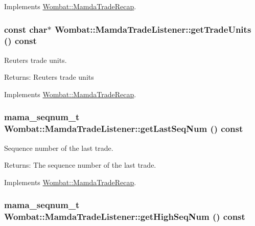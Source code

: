 Implements \hyperlink{classWombat_1_1MamdaTradeRecap_a2fb46ed6a57f14eb2a25ddbca0d902a}{Wombat::Mamda\-Trade\-Recap}.\hypertarget{classWombat_1_1MamdaTradeListener_c4b602c4ce2f49e81d4d20eef7d60711}{
\subsubsection[getTradeUnits]{\setlength{\rightskip}{0pt plus 5cm}const char$\ast$ Wombat::Mamda\-Trade\-Listener::get\-Trade\-Units () const}}
\label{classWombat_1_1MamdaTradeListener_c4b602c4ce2f49e81d4d20eef7d60711}


Reuters trade units. 

\begin{Desc}
\item[Returns:]Reuters trade units \end{Desc}


Implements \hyperlink{classWombat_1_1MamdaTradeRecap_f1d081fdecd01cd5e59210ff4be63d16}{Wombat::Mamda\-Trade\-Recap}.\hypertarget{classWombat_1_1MamdaTradeListener_bac3ca4094b86f6dd797e68417f04c15}{
\subsubsection[getLastSeqNum]{\setlength{\rightskip}{0pt plus 5cm}mama\_\-seqnum\_\-t Wombat::Mamda\-Trade\-Listener::get\-Last\-Seq\-Num () const}}
\label{classWombat_1_1MamdaTradeListener_bac3ca4094b86f6dd797e68417f04c15}


Sequence number of the last trade. 

\begin{Desc}
\item[Returns:]The sequence number of the last trade. \end{Desc}


Implements \hyperlink{classWombat_1_1MamdaTradeRecap_ce7f7d8ec0c4d3df1905f7f68c16d42b}{Wombat::Mamda\-Trade\-Recap}.\hypertarget{classWombat_1_1MamdaTradeListener_cfa0551c486d97d5cb04e17f2d2483d4}{
\subsubsection[getHighSeqNum]{\setlength{\rightskip}{0pt plus 5cm}mama\_\-seqnum\_\-t Wombat::Mamda\-Trade\-Listener::get\-High\-Seq\-Num () const}}
\label{classWombat_1_1MamdaTradeListener_cfa0551c486d97d5cb04e17f2d2483d4}


